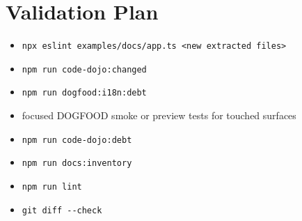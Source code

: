\section{Validation Plan}\label{record-198-validation-plan}

\begin{itemize}
\tightlist
\item
  \texttt{n\allowbreak{}p\allowbreak{}x\allowbreak{} \allowbreak{}e\allowbreak{}s\allowbreak{}l\allowbreak{}i\allowbreak{}n\allowbreak{}t\allowbreak{} \allowbreak{}e\allowbreak{}x\allowbreak{}a\allowbreak{}m\allowbreak{}p\allowbreak{}l\allowbreak{}e\allowbreak{}s\allowbreak{}/\allowbreak{}d\allowbreak{}o\allowbreak{}c\allowbreak{}s\allowbreak{}/\allowbreak{}a\allowbreak{}p\allowbreak{}p\allowbreak{}.\allowbreak{}t\allowbreak{}s\allowbreak{} \allowbreak{}<\allowbreak{}n\allowbreak{}e\allowbreak{}w\allowbreak{} \allowbreak{}e\allowbreak{}x\allowbreak{}t\allowbreak{}r\allowbreak{}a\allowbreak{}c\allowbreak{}t\allowbreak{}e\allowbreak{}d\allowbreak{} \allowbreak{}f\allowbreak{}i\allowbreak{}l\allowbreak{}e\allowbreak{}s\allowbreak{}>}
\item
  \texttt{n\allowbreak{}p\allowbreak{}m\allowbreak{} \allowbreak{}r\allowbreak{}u\allowbreak{}n\allowbreak{} \allowbreak{}c\allowbreak{}o\allowbreak{}d\allowbreak{}e\allowbreak{}-\allowbreak{}d\allowbreak{}o\allowbreak{}j\allowbreak{}o\allowbreak{}:\allowbreak{}c\allowbreak{}h\allowbreak{}a\allowbreak{}n\allowbreak{}g\allowbreak{}e\allowbreak{}d}
\item
  \texttt{n\allowbreak{}p\allowbreak{}m\allowbreak{} \allowbreak{}r\allowbreak{}u\allowbreak{}n\allowbreak{} \allowbreak{}d\allowbreak{}o\allowbreak{}g\allowbreak{}f\allowbreak{}o\allowbreak{}o\allowbreak{}d\allowbreak{}:\allowbreak{}i\allowbreak{}1\allowbreak{}8\allowbreak{}n\allowbreak{}:\allowbreak{}d\allowbreak{}e\allowbreak{}b\allowbreak{}t}
\item
  focused DOGFOOD smoke or preview tests for touched surfaces
\item
  \texttt{n\allowbreak{}p\allowbreak{}m\allowbreak{} \allowbreak{}r\allowbreak{}u\allowbreak{}n\allowbreak{} \allowbreak{}c\allowbreak{}o\allowbreak{}d\allowbreak{}e\allowbreak{}-\allowbreak{}d\allowbreak{}o\allowbreak{}j\allowbreak{}o\allowbreak{}:\allowbreak{}d\allowbreak{}e\allowbreak{}b\allowbreak{}t}
\item
  \texttt{n\allowbreak{}p\allowbreak{}m\allowbreak{} \allowbreak{}r\allowbreak{}u\allowbreak{}n\allowbreak{} \allowbreak{}d\allowbreak{}o\allowbreak{}c\allowbreak{}s\allowbreak{}:\allowbreak{}i\allowbreak{}n\allowbreak{}v\allowbreak{}e\allowbreak{}n\allowbreak{}t\allowbreak{}o\allowbreak{}r\allowbreak{}y}
\item
  \texttt{n\allowbreak{}p\allowbreak{}m\allowbreak{} \allowbreak{}r\allowbreak{}u\allowbreak{}n\allowbreak{} \allowbreak{}l\allowbreak{}i\allowbreak{}n\allowbreak{}t}
\item
  \texttt{g\allowbreak{}i\allowbreak{}t\allowbreak{} \allowbreak{}d\allowbreak{}i\allowbreak{}f\allowbreak{}f\allowbreak{} \allowbreak{}-\allowbreak{}-\allowbreak{}c\allowbreak{}h\allowbreak{}e\allowbreak{}c\allowbreak{}k}
\end{itemize}

